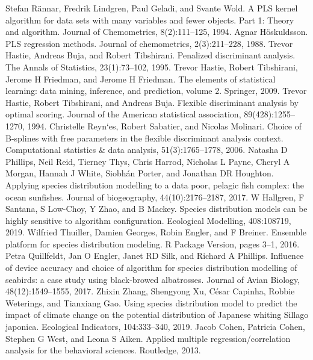 \documentclass[preprint,12pt]{elsarticle}
\begin{document}
\begin{thebibliography}{000}
 Stefan Rännar, Fredrik Lindgren, Paul Geladi, and Svante Wold. A PLS kernel algorithm for data sets with many variables and fewer objects. Part 1: Theory and algorithm. Journal of Chemometrics, 8(2):111–125, 1994. 
 Agnar Höskuldsson. PLS regression methods. Journal of chemometrics, 2(3):211–228, 1988. 
 Trevor Hastie, Andreas Buja, and Robert Tibshirani. Penalized discriminant analysis. The Annals of Statistics, 23(1):73–102, 1995. 
 Trevor Hastie, Robert Tibshirani, Jerome H Friedman, and Jerome H Friedman. The elements of statistical learning: data mining, inference, and prediction, volume 2. Springer, 2009. 
 Trevor Hastie, Robert Tibshirani, and Andreas Buja. Flexible discriminant analysis by optimal scoring. Journal of the American statistical association, 89(428):1255–1270, 1994. 
 Christelle Reyn`es, Robert Sabatier, and Nicolas Molinari. Choice of B-splines with free parameters in the flexible discriminant analysis context. Computational statistics & data analysis, 51(3):1765–1778, 2006. 
 Natasha D Phillips, Neil Reid, Tierney Thys, Chris Harrod, Nicholas L Payne, Cheryl A Morgan, Hannah J White, Siobhán Porter, and Jonathan DR Houghton. Applying species distribution modelling to a data poor, pelagic fish complex: the ocean sunfishes. Journal of biogeography, 44(10):2176–2187, 2017. 
 W Hallgren, F Santana, S Low-Choy, Y Zhao, and B Mackey. Species distribution models can be highly sensitive to algorithm configuration. Ecological Modelling, 408:108719, 2019. 
 Wilfried Thuiller, Damien Georges, Robin Engler, and F Breiner. Ensemble platform for species distribution modeling. R Package Version, pages 3–1, 2016. 
 Petra Quillfeldt, Jan O Engler, Janet RD Silk, and Richard A Phillips. Influence of device accuracy and choice of algorithm for species distribution modelling of seabirds: a case study using black-browed albatrosses. Journal of Avian Biology, 48(12):1549–1555, 2017. 
 Zhixin Zhang, Shengyong Xu, César Capinha, Robbie Weterings, and Tianxiang Gao. Using species distribution model to predict the impact of climate change on the potential distribution of Japanese whiting Sillago japonica. Ecological Indicators, 104:333–340, 2019. 
 Jacob Cohen, Patricia Cohen, Stephen G West, and Leona S Aiken. Applied multiple regression/correlation analysis for the behavioral sciences. Routledge, 2013. 

\end{thebibliography}
\end{document}
